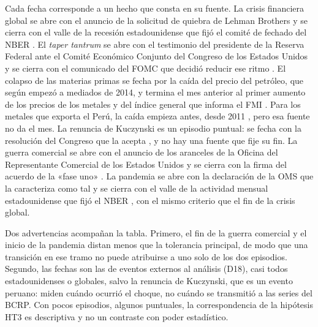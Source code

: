 Cada fecha corresponde a un hecho que consta en su fuente. La crisis financiera global se abre con
el anuncio de la solicitud de quiebra de Lehman Brothers \parencite{lehman_brothers_2008} y se
cierra con el valle de la recesión estadounidense que fijó el comité de fechado del NBER
\parencite{nber_2010}. El \emph{taper tantrum} se abre con el testimonio del presidente de la
Reserva Federal ante el Comité Económico Conjunto del Congreso de los Estados Unidos
\parencite{bernanke_2013} y se cierra con el
comunicado del FOMC que decidió reducir ese ritmo \parencite{reserva_federal_2013}. El colapso de
las materias primas se fecha por la caída del precio del petróleo, que según
\textcite{stocker_et_al_2015} empezó a mediados de 2014, y termina el mes anterior al primer
aumento de los precios de los metales y del índice general que informa el FMI
\parencite{fmi_2016}. Para los metales que exporta el Perú, la caída empieza antes, desde 2011
\parencite{fmi_2015b}, pero esa fuente no da el mes. La renuncia de Kuczynski es un episodio puntual: se fecha
con la resolución del Congreso que la acepta \parencite{congreso_2018}, y no hay una fuente que fije su fin. La guerra comercial se abre con el
anuncio de los aranceles de la Oficina del Representante Comercial de los Estados Unidos
\parencite{ustr_2018} y se cierra con la firma del acuerdo de la «fase uno»
\parencite{ustr_2020}. La pandemia se abre con la declaración de la OMS que la caracteriza como
tal \parencite{oms_2020b} y se cierra con el valle de la actividad mensual estadounidense que fijó
el NBER \parencite{nber_2021}, con el mismo criterio que el fin de la crisis global.

Dos advertencias acompañan la tabla. Primero, el fin de la guerra comercial y el inicio de la
pandemia distan menos que la tolerancia principal, de modo que una transición en ese tramo no
puede atribuirse a uno solo de los dos episodios. Segundo, las fechas son las de eventos
externos al análisis (D18), casi todos estadounidenses o globales, salvo la renuncia de
Kuczynski, que es un evento peruano: miden cuándo ocurrió el choque, no cuándo se transmitió a
las series del BCRP. Con pocos episodios, algunos puntuales, la correspondencia de la
hipótesis HT3 es descriptiva y no un contraste con poder estadístico.

